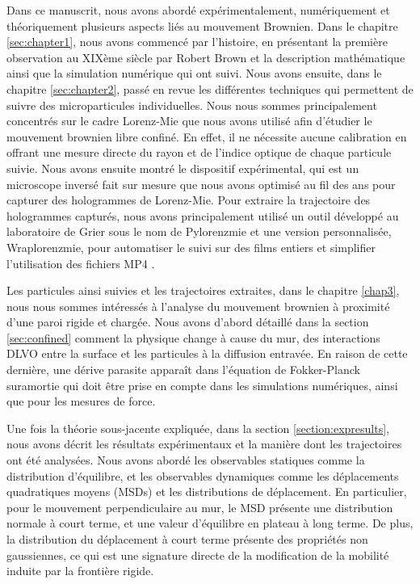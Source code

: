 Dans ce manuscrit, nous avons abordé expérimentalement, numériquement et théoriquement plusieurs aspects liés au mouvement Brownien. Dans le chapitre \ref{sec:chapter1}, nous avons commencé par l'histoire, en présentant la première observation au XIXème siècle par Robert Brown et la description mathématique ainsi que la simulation numérique qui ont suivi. Nous avons ensuite, dans le chapitre \ref{sec:chapter2}, passé en revue les différentes techniques qui permettent de suivre des microparticules individuelles. Nous nous sommes principalement concentrés sur le cadre Lorenz-Mie que nous avons utilisé afin d'étudier le mouvement brownien libre confiné. En effet, il ne nécessite aucune calibration en offrant une mesure directe du rayon et de l'indice optique de chaque particule suivie. Nous avons ensuite montré le dispositif expérimental, qui est un microscope inversé fait sur mesure que nous avons optimisé au fil des ans pour capturer des hologrammes de Lorenz-Mie. Pour extraire la trajectoire des hologrammes capturés, nous avons principalement utilisé un outil développé au laboratoire de Grier sous le nom de Pylorenzmie \href{https://github.com/davidgrier/pylorenzmie}{\faGithub} et une version personnalisée, Wraplorenzmie, pour automatiser le suivi sur des films entiers et simplifier l'utilisation des fichiers MP4 \href{https://github.com/eXpensia/wraplorenzmie}{\faGithub}.

Les particules ainsi suivies et les trajectoires extraites, dans le chapitre \ref{chap3}, nous nous sommes intéressés à l'analyse du mouvement brownien à proximité d'une paroi rigide et chargée. Nous avons d'abord détaillé dans la section \ref{sec:confined} comment la physique change à cause du mur, des interactions DLVO entre la surface et les particules à la diffusion entravée. En raison de cette dernière, une dérive parasite apparaît dans l'équation de Fokker-Planck suramortie qui doit être prise en compte dans les simulations numériques, ainsi que pour les mesures de force.

Une fois la théorie sous-jacente expliquée, dans la section \ref{section:expresults}, nous avons décrit les résultats expérimentaux et la manière dont les trajectoires ont été analysées. Nous avons abordé les observables statiques comme la distribution d'équilibre, et les observables dynamiques comme les déplacements quadratiques moyens (\gls{MSD}s) et les distributions de déplacement. En particulier, pour le mouvement perpendiculaire au mur, le \gls{MSD} présente une distribution normale à court terme, et une valeur d'équilibre en plateau à long terme. De plus, la distribution du déplacement à court terme présente des propriétés non gaussiennes, ce qui est une signature directe de la modification de la mobilité induite par la frontière rigide.

